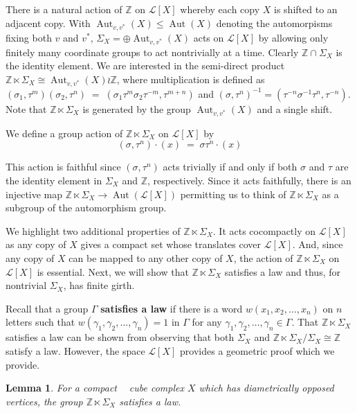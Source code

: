 \documentclass{amsart}
\newtheorem{lemma}[theorem]{Lemma}
\theoremstyle{definition}
\newtheorem*{Notation warning}{Warning on notations}
\newtheorem*{Sketch of proof}{Sketch of proof for Theorem C}
\DeclareMathOperator{\cat}{CAT(0)}
\def\aut{\mathop{\mathrm{Aut}}\nolimits}
\begin{document}
\begin{sloppypar}
There is a natural action of $\mathbb{Z}$ on $\mathcal{L}[X]$ whereby each copy $X$ is shifted to an adjacent copy. With $\aut_{v,v^*}(X)\le \aut(X)$ denoting the automorpisms fixing both $v$ and $v^*$, $\Sigma_X=\oplus \aut_{v,v^*}(X)$ acts on $\mathcal{L}[X]$ by allowing only finitely many coordinate groups to act nontrivially at a time. Clearly $\mathbb{Z}\cap \Sigma_X$ is the identity element. We are interested in the semi-direct product $\mathbb{Z}\ltimes \Sigma_X\cong\aut_{v,v^*}(X)\wr\mathbb{Z}$, where multiplication is defined as $(\sigma_1,\tau^m)(\sigma_2,\tau^n)\;=\;(\sigma_1\tau^m\sigma_2\tau^{-m},\tau^{m+n})$ and $(\sigma,\tau^n)^{-1}=(\tau^{-n}\sigma^{-1}\tau^n,\tau^{-n})$. 
Note that $\mathbb{Z}\ltimes\Sigma_X$ is generated by the group $\aut_{v,v^*}(X)$ and a single shift. 
\medskip

We define a group action of $\mathbb{Z}\ltimes\Sigma_X$ on $\mathcal{L}[X]$ by 
\[
    (\sigma,\tau^n)\cdot (x)\;=\;\sigma\tau^n\cdot(x)
\]
 
This action is faithful since $(\sigma,\tau^n)$ acts trivially if and only if both $\sigma$ and $\tau$ are the identity element in $\Sigma_X$ and $\mathbb{Z}$, respectively. Since it acts faithfully, there is an injective map $\mathbb{Z}\ltimes\Sigma_X\to\aut(\mathcal{L}[X])$ permitting us to think of $\mathbb{Z}\ltimes\Sigma_X$ as a subgroup of the automorphism group.
\medskip

We highlight two additional properties of $\mathbb{Z}\ltimes\Sigma_X$. It acts cocompactly on $\mathcal{L}[X]$ as any copy of $X$ gives a compact set whose translates cover $\mathcal{L}[X]$. And, since any copy of $X$ can be mapped to any other copy of $X$, the action of $\mathbb{Z}\ltimes\Sigma_X$ on $\mathcal{L}[X]$ is essential.
Next, we will show that $\mathbb{Z}\ltimes\Sigma_X$ satisfies a law and thus, for nontrivial $\Sigma_X$, has finite girth.
\medskip

Recall that a group $\Gamma$ {\bf satisfies a law} if there is a word $w(x_1,x_2,\ldots,x_n)$ on $n$ letters such that $w(\gamma_1,\gamma_2,\ldots,\gamma_n)=1$ in $\Gamma$ for any $\gamma_1,\gamma_2,\ldots,\gamma_n\in \Gamma$. That $\mathbb{Z}\ltimes\Sigma_X$ satisfies a law can be shown from observing that both $\Sigma_X$ and ${\mathbb{Z}\ltimes\Sigma_X}/\Sigma_X\cong\mathbb{Z}$ satisfy a law. However, the space $\mathcal{L}[X]$ provides a geometric proof which we provide.

\begin{lemma}\label{lem: satisifes law}
    For a compact $\cat$ cube complex $X$ which has diametrically opposed vertices, the group $\mathbb{Z}\ltimes\Sigma_X$ satisfies a law.
\end{lemma}


\end{sloppypar}
\end{document}
